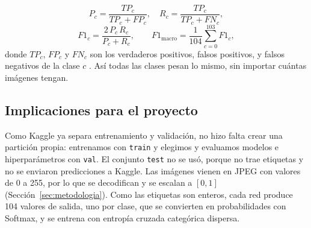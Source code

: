 \begin{equation}
P_c=\frac{TP_c}{TP_c+FP_c}, \quad R_c=\frac{TP_c}{TP_c+FN_c},
\end{equation}
\begin{equation}
F1_c=\frac{2\,P_c\,R_c}{P_c+R_c}, \qquad F1_{\text{macro}}=\frac{1}{104}\sum_{c=0}^{103}F1_c,
\end{equation}
donde $TP_c$, $FP_c$ y $FN_c$ son los verdaderos positivos, falsos positivos, y falsos negativos de la clase $c$ . Así todas las clases pesan lo mismo, sin importar cuántas imágenes tengan. 

\subsection{Implicaciones para el proyecto}
Como Kaggle ya separa entrenamiento y validación, no hizo falta crear una partición propia: entrenamos con \texttt{train} y elegimos y evaluamos modelos e hiperparámetros con \texttt{val}. El conjunto \texttt{test} no se usó, porque no trae etiquetas y no se enviaron predicciones a Kaggle. Las imágenes vienen en JPEG con valores de 0 a 255, por lo que se decodifican y se escalan a $[0,1]$ (Sección~\ref{sec:metodologia}). Como las etiquetas son enteros, cada red produce 104 valores de salida, uno por clase, que se convierten en probabilidades con Softmax, y se entrena con entropía cruzada categórica dispersa.
